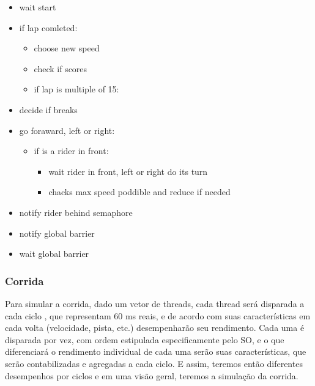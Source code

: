 \documentclass[12pt,a4paper]{article}
\begin{document}
    \begin{itemize}
    \item wait start
    \item if lap comleted:   
    \begin{itemize}
      \item choose new speed
      \item check if scores
      \item if lap is multiple of 15:
    \end{itemize}
    \item decide if breaks
    \item go foraward, left or right:
    \begin{itemize}
      \item if is a rider in front:
      \begin{itemize}
        \item wait rider in front, left or right do its turn
        \item       chacks max speed poddible and reduce if needed
      \end{itemize}
    \end{itemize}
    \item notify rider behind semaphore
    \item notify global barrier
    \item wait global barrier
    \end{itemize}
    
\subsubsection{Corrida}

    Para simular a corrida, dado um vetor de threads, cada thread será disparada a cada ciclo , que representam 60 ms reais, e de acordo com suas características em cada volta (velocidade, pista, etc.) desempenharão seu rendimento. Cada uma é disparada por vez, com ordem estipulada especificamente pelo SO, e o que diferenciará o rendimento individual de cada uma serão suas características, que serão contabilizadas e agregadas a cada ciclo. E assim, teremos então diferentes desempenhos por ciclos e em uma visão geral, teremos a simulação da corrida.
    
\end{document}
